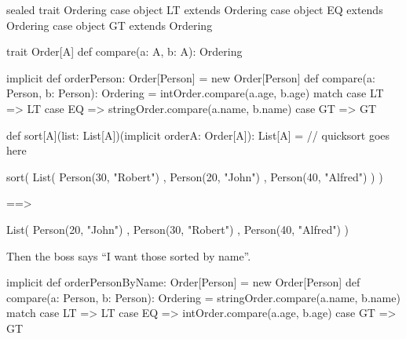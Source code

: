 \documentclass[usenames,dvipsnames,svgnames,table,aspectratio=169,mathserif]{beamer}
\newcommand{\nl}{\vspace{\baselineskip}}
\newcommand{\pnl}{\pause \nl}
\begin{document}
\begin{frame}[fragile]
\begin{scalacode}
sealed trait Ordering
case object LT extends Ordering
case object EQ extends Ordering
case object GT extends Ordering
\end{scalacode}

\pnl

\begin{scalacode}
trait Order[A] {
  def compare(a: A, b: A): Ordering
}
\end{scalacode}

\pnl

\begin{scalacode}
implicit def orderPerson: Order[Person] = new Order[Person] {
  def compare(a: Person, b: Person): Ordering =
    intOrder.compare(a.age, b.age) match {
      case LT => LT
      case EQ => stringOrder.compare(a.name, b.name)
      case GT => GT
    }
}
\end{scalacode}
\end{frame}


\begin{frame}[fragile]
\begin{scalacode}
def sort[A](list: List[A])(implicit orderA: Order[A]): List[A] = {
  // quicksort goes here
}
\end{scalacode}
\end{frame}


\begin{frame}[fragile]
\begin{scalacode}
sort(
  List(
    Person(30, "Robert")
  , Person(20, "John")
  , Person(40, "Alfred")
  )
)
\end{scalacode}

\pnl

\begin{scalacode}
==>

List(
  Person(20, "John")
, Person(30, "Robert")
, Person(40, "Alfred")
)
\end{scalacode}
\end{frame}


\begin{frame}[fragile]
Then the boss says ``I want those sorted by name''.

\pnl

\begin{scalacode}
implicit def orderPersonByName: Order[Person] = new Order[Person] {
  def compare(a: Person, b: Person): Ordering =
    stringOrder.compare(a.name, b.name) match {
      case LT => LT
      case EQ => intOrder.compare(a.age, b.age)
      case GT => GT
    }
}
\end{scalacode}


\end{frame}
\end{document}
